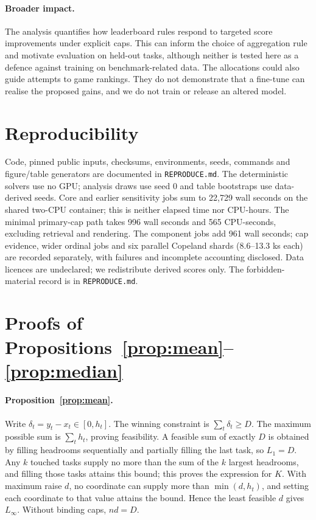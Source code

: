 \documentclass{article}
\begin{document}
\paragraph{Broader impact.}
The analysis quantifies how leaderboard rules respond to targeted score improvements under explicit caps. This can inform the choice of aggregation rule and motivate evaluation on held-out tasks, although neither is tested here as a defence against training on benchmark-related data. The allocations could also guide attempts to game rankings. They do not demonstrate that a fine-tune can realise the proposed gains, and we do not train or release an altered model.

\section{Reproducibility}
\label{sec:repro}
Code, pinned public inputs, checksums, environments, seeds, commands and figure/table generators are documented in \texttt{REPRODUCE.md}. The deterministic solvers use no GPU; analysis draws use seed 0 and table bootstraps use data-derived seeds. Core and earlier sensitivity jobs sum to 22,729 wall seconds on the shared two-CPU container; this is neither elapsed time nor CPU-hours. The minimal primary-cap path takes 996 wall seconds and 565 CPU-seconds, excluding retrieval and rendering. The component jobs add 961 wall seconds; cap evidence, wider ordinal jobs and six parallel Copeland shards (8.6--13.3 ks each) are recorded separately, with failures and incomplete accounting disclosed. Data licences are undeclared; we redistribute derived scores only. The forbidden-material record is in \texttt{REPRODUCE.md}.






\appendix
\section{Proofs of Propositions~\ref{prop:mean}--\ref{prop:median}}
\label{app:proofs}
\paragraph{Proposition~\ref{prop:mean}.} Write $\delta_t=y_t-x_t\in[0,h_t]$. The winning constraint is $\sum_t\delta_t\ge D$. The maximum possible sum is $\sum_t h_t$, proving feasibility. A feasible sum of exactly $D$ is obtained by filling headrooms sequentially and partially filling the last task, so $L_1=D$. Any $k$ touched tasks supply no more than the sum of the $k$ largest headrooms, and filling those tasks attains this bound; this proves the expression for $K$. With maximum raise $d$, no coordinate can supply more than $\min(d,h_t)$, and setting each coordinate to that value attains the bound. Hence the least feasible $d$ gives $L_\infty$. Without binding caps, $nd=D$.
\end{document}
